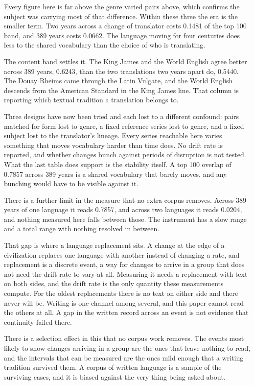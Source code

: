 Every figure here is far above the genre varied pairs above, which confirms the subject was carrying most of that difference. Within these three the era is the smaller term. Two years across a change of translator costs 0.1481 of the top 100 band, and 389 years costs 0.0662. The language moving for four centuries does less to the shared vocabulary than the choice of who is translating.

The content band settles it. The King James and the World English agree better across 389 years, 0.6243, than the two translations two years apart do, 0.5440. The Douay Rheims came through the Latin Vulgate, and the World English descends from the American Standard in the King James line. That column is reporting which textual tradition a translation belongs to.

Three designs have now been tried and each lost to a different confound: pairs matched for form lost to genre, a fixed reference series lost to genre, and a fixed subject lost to the translator's lineage. Every series reachable here varies something that moves vocabulary harder than time does. No drift rate is reported, and whether changes bunch against periods of disruption is not tested. What the last table does support is the stability itself. A top 100 overlap of 0.7857 across 389 years is a shared vocabulary that barely moves, and any bunching would have to be visible against it.

There is a further limit in the measure that no extra corpus removes. Across 389 years of one language it reads 0.7857, and across two languages it reads 0.0204, and nothing measured here falls between those. The instrument has a slow range and a total range with nothing resolved in between.

That gap is where a language replacement sits. A change at the edge of a civilization replaces one language with another instead of changing a rate, and replacement is a discrete event, a way for changes to arrive in a group that does not need the drift rate to vary at all. Measuring it needs a replacement with text on both sides, and the drift rate is the only quantity these measurements compute. For the oldest replacements there is no text on either side and there never will be. Writing is one channel among several, and this paper cannot read the others at all. A gap in the written record across an event is not evidence that continuity failed there.

There is a selection effect in this that no corpus work removes. The events most likely to show changes arriving in a group are the ones that leave nothing to read, and the intervals that can be measured are the ones mild enough that a writing tradition survived them. A corpus of written language is a sample of the surviving cases, and it is biased against the very thing being asked about.


